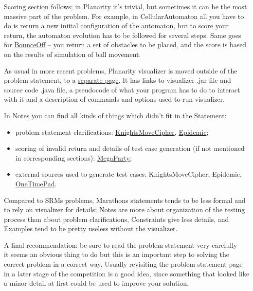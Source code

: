 \documentclass[]{article}
\begin{document}
Scoring section follows; in Planarity it's trivial, but sometimes it can
be the most massive part of the problem. For example, in
CellularAutomaton all you have to do is return a new initial
configuration of the automaton, but to score your return, the automaton
evolution has to be followed for several steps. Same goes for
\href{http://community.topcoder.com/longcontest/?module=ViewProblemStatement\&rd=13791\&pm=10372}{BounceOff}
-- you return a set of obstacles to be placed, and the score is based on
the results of simulation of ball movement.

As usual in more recent problems, Planarity visualizer is moved outside
of the problem statement, to a
\href{https://www.topcoder.com/contest/problem/Planarity/manual.html}{separate
page}. It has links to visualizer .jar file and source code .java file,
a pseudocode of what your program has to do to interact with it and a
description of commands and options used to run visualizer.

In Notes you can find all kinds of things which didn't fit in the
Statement:

\begin{itemize}
\item
  problem statement clarifications:
  \href{http://community.topcoder.com/longcontest/?module=ViewProblemStatement\&rd=13679\&pm=10242}{KnightsMoveCipher},
  \href{http://community.topcoder.com/longcontest/?module=ViewProblemStatement\&rd=11131\&pm=8632}{Epidemic};
\item
  scoring of invalid return and details of test case generation (if not
  mentioned in corresponding sections):
  \href{http://community.topcoder.com/longcontest/?module=ViewProblemStatement\&rd=13709\&pm=10032}{MegaParty};
\item
  external sources used to generate test cases: KnightsMoveCipher,
  Epidemic,
  \href{http://community.topcoder.com/longcontest/?module=ViewProblemStatement\&rd=13564\&pm=9906}{OneTimePad}.
\end{itemize}

Compared to SRMs problems, Marathons statements tends to be less formal
and to rely on visualizer for details; Notes are more about organization
of the testing process than about problem clarifications, Constraints
give less details, and Examples tend to be pretty useless without the
visualizer.

A final recommendation: be sure to read the problem statement very
carefully -- it seems an obvious thing to do but this is an important
step to solving the correct problem in a correct way. Usually revisiting
the problem statement page in a later stage of the competition is a good
idea, since something that looked like a minor detail at first could be
used to improve your solution.
\end{document}
